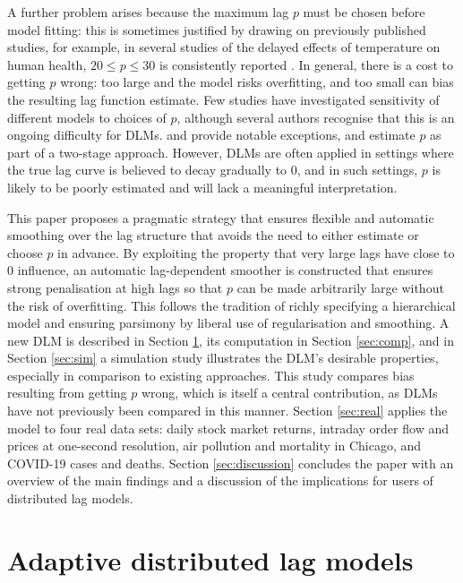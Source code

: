\documentclass[11pt]{article}
\begin{document}
A further problem arises because the maximum lag $p$ must be chosen before
model fitting: this is sometimes justified by drawing on previously published
studies, for example, in several studies of the delayed effects of temperature
on human health, $20 \leq p \leq 30$ is consistently reported
\citep{braga2002, armstrong2006, gasparrini2013}. In general, there is a cost
to getting $p$ wrong: too large and the model risks overfitting, and too small
can bias the resulting lag function estimate. Few studies have investigated
sensitivity of different models to choices of $p$, although several authors
recognise that this is an ongoing difficulty for DLMs. \citet{heaton2012} and
\citet{heaton2014} provide notable exceptions, and estimate $p$ as part of a
two-stage approach. However, DLMs are often applied in settings where the true
lag curve is believed to decay gradually to 0, and in such settings, $p$ is
likely to be poorly estimated and will lack a meaningful interpretation.

This paper proposes a pragmatic strategy that ensures flexible and automatic
smoothing over the lag structure that avoids the need to either estimate or
choose $p$ in advance. By exploiting the property that very large lags have
close to 0 influence, an automatic lag-dependent smoother is constructed that
ensures strong penalisation at high lags so that $p$ can be made arbitrarily
large without the risk of overfitting. This follows the tradition of richly
specifying a hierarchical model and ensuring parsimony by liberal use of
regularisation and smoothing. A new DLM is described in Section
\ref{sec:model}, its computation in Section \ref{sec:comp}, and in Section
\ref{sec:sim} a simulation study
illustrates the DLM's desirable properties, especially in comparison to
existing approaches. This study compares bias resulting from getting $p$
wrong, which is itself a central contribution, as DLMs have not previously
been compared in this manner. Section \ref{sec:real} applies the model
to four real data sets: daily stock market returns, intraday order flow and
prices at one-second resolution, air pollution and mortality in Chicago, and
COVID-19 cases and deaths.
Section \ref{sec:discussion} concludes the paper with an overview of the main
findings and a discussion of the implications for users of distributed lag
models.

\section{Adaptive distributed lag models}
\label{sec:model}
\end{document}

